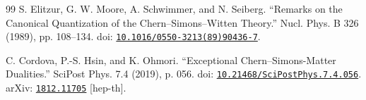 \documentclass[11pt,a4paper]{article}
\numberwithin{equation}{section}
\begin{document}
\begin{thebibliography}{99}
S. Elitzur, G. W. Moore, A. Schwimmer, and N. Seiberg. ``Remarks on the Canonical Quantization of the Chern--Simons--Witten Theory.'' Nucl. Phys. B 326 (1989), pp. 108--134. doi: \href{https://doi.org/10.1016/0550-3213(89)90436-7}{\nolinkurl{10.1016/0550-3213(89)90436-7}}.

C. Cordova, P.-S. Hsin, and K. Ohmori. ``Exceptional Chern--Simons-Matter Dualities.'' SciPost Phys. 7.4 (2019), p. 056. doi: \href{https://doi.org/10.21468/SciPostPhys.7.4.056}{\nolinkurl{10.21468/SciPostPhys.7.4.056}}. arXiv: \href{https://arxiv.org/abs/1812.11705}{\nolinkurl{1812.11705}} [hep-th].

\end{thebibliography}
\end{document}
